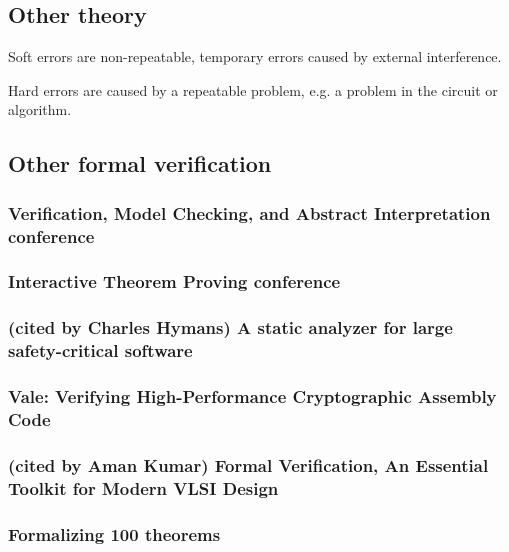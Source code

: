 \documentclass{article}
\begin{document}

\subsection{Other theory}

Soft errors are non-repeatable, temporary errors caused by external interference.

Hard errors are caused by a repeatable problem, e.g. a problem in the circuit or algorithm.


\subsection{Other formal verification}

\subsubsection{Verification, Model Checking, and Abstract Interpretation conference}

\subsubsection{Interactive Theorem Proving conference}

\subsubsection{(cited by Charles Hymans) A static analyzer for large safety-critical software}


\subsubsection{Vale: Verifying {High-Performance} Cryptographic Assembly Code}

\subsubsection{(cited by Aman Kumar) Formal Verification, An Essential Toolkit for Modern VLSI Design} 

\subsubsection{Formalizing 100 theorems}
\end{document}

